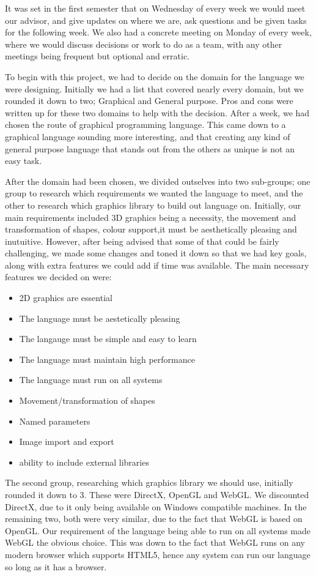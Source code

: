 \documentclass{l3proj}
\begin{document}
It was set in the first semester that on Wednesday of every week we would meet our advisor, and give updates on where we are, ask questions and be given tasks for the following week. We also had a concrete meeting on Monday of every week, where we would discuss decisions or work to do as a team, with any other meetings being frequent but optional and erratic.

To begin with this project, we had to decide on the domain for the language we were designing. Initially we had a list that covered nearly every domain, but we rounded it down to two; Graphical and General purpose. Pros and cons were written up for these two domains to help with the decision. After a week, we had chosen the route of graphical programming language. This came down to a graphical language sounding more interesting, and that creating any kind of general purpose language that stands out from the others as unique is not an easy task.

After the domain had been chosen, we divided outselves into two sub-groups; one group to research which requirements we wanted the language to meet, and the other to research which graphics library to build out language on. Initially, our main requirements included 3D graphics being a necessity, the movement and transformation of shapes, colour support,it must be aesthetically pleasing and inutuitive. However, after being advised that some of that could be fairly challenging, we made some changes and toned it down so that we had key goals, along with extra features we could add if time was available. The main necessary features we decided on were:
\begin{itemize}
\item 2D graphics are essential
\item The language must be aestetically pleasing
\item The langauge must be simple and easy to learn
\item The language must maintain high performance
\item The language must run on all systems
\item Movement/transformation of shapes
\item Named parameters
\item Image import and export
\item ability to include external libraries
\end{itemize}
The second group, researching which graphics library we should use, initially rounded it down to 3. These were DirectX, OpenGL and WebGL. We discounted DirectX, due to it only being available on Windows compatible machines. In the remaining two, both were very similar, due to the fact that WebGL is based on OpenGL. Our requirement of the language being able to run on all systems made WebGL the obvious choice. This was down to the fact that WebGL runs on any modern browser which supports HTML5, hence any system can run our language so long as it has a browser.
\end{document}
